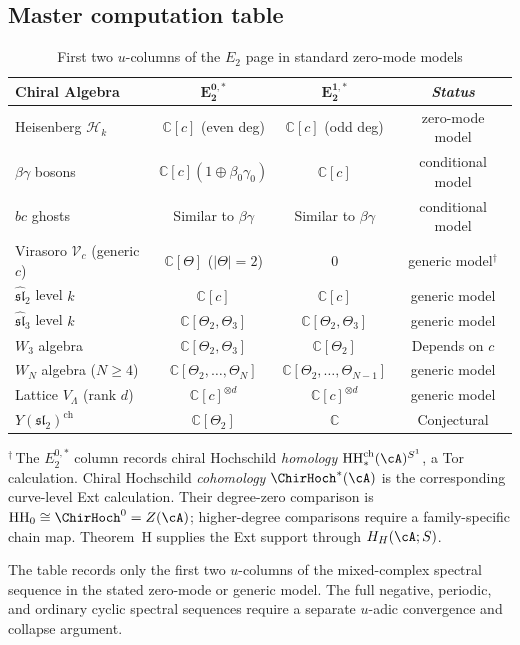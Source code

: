 \subsection{Master computation table}

\begin{table}[H]
\centering
\caption{\texorpdfstring{First two $u$-columns of the $E_2$}{First two u-columns of the E2} page in standard zero-mode models}
\begin{tabular}{|l|c|c|c|}
\hline
\textbf{Chiral Algebra} & $\mathbf{E_2^{0,*}}$ & $\mathbf{E_2^{1,*}}$ &
\emph{Status} \\
\hline
Heisenberg $\mathcal{H}_k$ & $\mathbb{C}[c]$ (even deg) & $\mathbb{C}[c]$ (odd deg) &
zero-mode model \\
\hline
$\beta\gamma$ bosons & $\mathbb{C}[c](1 \oplus \beta_0\gamma_0)$ & $\mathbb{C}[c]$ &
conditional model \\
\hline
$bc$ ghosts & Similar to $\beta\gamma$ & Similar to $\beta\gamma$ & conditional model \\
\hline
Virasoro $\mathcal{V}_c$ (generic $c$) & $\mathbb{C}[\Theta]$ ($|\Theta| = 2$) & 0 &
generic model${}^\dagger$ \\
\hline
$\widehat{\mathfrak{sl}}_2$ level $k$ & $\mathbb{C}[c]$ & $\mathbb{C}[c]$ & generic model \\
\hline
$\widehat{\mathfrak{sl}}_3$ level $k$ & $\mathbb{C}[\Theta_2, \Theta_3]$ & $\mathbb{C}[\Theta_2, \Theta_3]$ & generic model \\
\hline
$W_3$ algebra & $\mathbb{C}[\Theta_2, \Theta_3]$ & $\mathbb{C}[\Theta_2]$ & Depends on $c$ \\
\hline
$W_N$ algebra ($N \geq 4$) & $\mathbb{C}[\Theta_2, \ldots, \Theta_N]$ & $\mathbb{C}[\Theta_2, \ldots, \Theta_{N-1}]$ & generic model \\
\hline
Lattice $V_\Lambda$ (rank $d$) & $\mathbb{C}[c]^{\otimes d}$ & $\mathbb{C}[c]^{\otimes d}$ & generic model \\
\hline
$Y(\mathfrak{sl}_2)^{\mathrm{ch}}$ & $\mathbb{C}[\Theta_2]$ & $\mathbb{C}$ & Conjectural \\
\hline
\end{tabular}

\smallskip\noindent
${}^\dagger$\,The $E_2^{0,*}$ column records chiral Hochschild
\emph{homology} $\mathrm{HH}_*^{\mathrm{ch}}(\cA)^{S^1}$, a Tor
calculation.  Chiral Hochschild \emph{cohomology}
$\ChirHoch^*(\cA)$ is the corresponding curve-level Ext calculation.
Their degree-zero comparison is
$\mathrm{HH}_0\cong\ChirHoch^0=Z(\cA)$; higher-degree comparisons
require a family-specific chain map.  Theorem~H supplies the Ext
support through $H_H(\cA;S)$.

The table records only the first two $u$-columns of the mixed-complex
spectral sequence in the stated zero-mode or generic model. The full
negative, periodic, and ordinary cyclic spectral sequences require a
separate $u$-adic convergence and collapse argument.
\end{table}


